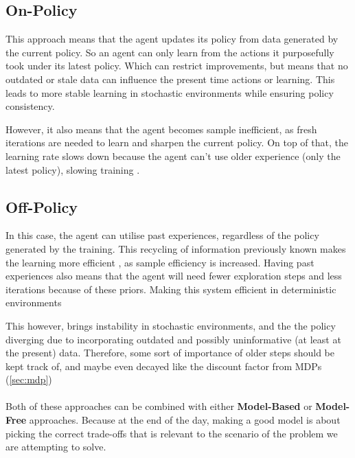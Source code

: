   \subsection{On-Policy}
  This approach means that the agent updates its policy from data generated by the current policy. So an agent can only learn from the actions it purposefully took under its latest policy. Which can restrict improvements, but means that no outdated or stale data can influence the present time actions or learning.
  This leads to more stable learning in stochastic environments  while ensuring policy consistency.

  However, it also means that the agent becomes sample inefficient, as fresh iterations are needed to learn and sharpen the current policy. On top of that, the learning rate slows down because the agent can't use older experience (only the latest policy), slowing training \cite{andrychowicz2020onpolicyRL}.

  \subsection{Off-Policy}
  In this case, the agent can utilise past experiences, regardless of the policy generated by the training. This recycling of information previously known makes the learning more efficient \cite{uehara2022reviewoffpolicyevaluationreinforcement}, as sample efficiency is increased.
  Having past experiences also means that the agent will need fewer exploration steps and less iterations because of these priors. Making this system efficient in deterministic environments 
  
  This however, brings instability in stochastic environments, and the the policy diverging due to incorporating outdated and possibly uninformative (at least at the present) data. Therefore, some sort of importance of older steps should be kept track of, and maybe even decayed like the discount factor from MDPs (\ref{sec:mdp}) 
  \\\\
  Both of these approaches can be combined with either \textbf{Model-Based} or \textbf{Model-Free} approaches. Because at the end of the day, making a good model is about picking the correct trade-offs that is relevant to the scenario of the problem we are attempting to solve.
